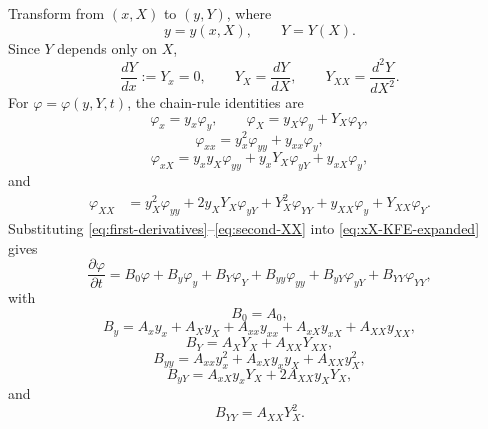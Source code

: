 \documentclass[11pt]{article}
\numberwithin{equation}{section}
\begin{document}
Transform from \((x,X)\) to \((y,Y)\), where
\begin{equation}
\label{eq:coordinate-transform}
y=y(x,X),
\qquad
Y=Y(X).
\end{equation}
Since \(Y\) depends only on \(X\),
\[
\frac{dY}{dx}:=Y_x=0,
\qquad
Y_X=\frac{dY}{dX},
\qquad
Y_{XX}=\frac{d^2Y}{dX^2}.
\]
For \(\varphi=\varphi(y,Y,t)\), the chain-rule identities are
\begin{equation}
\label{eq:first-derivatives}
\varphi_x=y_x\varphi_y,
\qquad
\varphi_X=y_X\varphi_y+Y_X\varphi_Y,
\end{equation}
\begin{equation}
\label{eq:second-xx}
\varphi_{xx}=y_x^2\varphi_{yy}+y_{xx}\varphi_y,
\end{equation}
\begin{equation}
\label{eq:second-xX}
\varphi_{xX}
=
y_xy_X\varphi_{yy}
+
y_xY_X\varphi_{yY}
+
y_{xX}\varphi_y,
\end{equation}
and
\begin{align}
\label{eq:second-XX}
\varphi_{XX}
&=
y_X^2\varphi_{yy}
+
2y_XY_X\varphi_{yY}
+
Y_X^2\varphi_{YY}
+
y_{XX}\varphi_y
+
Y_{XX}\varphi_Y.
\end{align}
Substituting \eqref{eq:first-derivatives}--\eqref{eq:second-XX} into \eqref{eq:xX-KFE-expanded} gives
\begin{equation}
\label{eq:yY-KFE-B}
\frac{\partial\varphi}{\partial t}
=
B_0\varphi+B_y\varphi_y+B_Y\varphi_Y+B_{yy}\varphi_{yy}+B_{yY}\varphi_{yY}+B_{YY}\varphi_{YY},
\end{equation}
with
\begin{equation}
\label{eq:B0}
B_0=A_0,
\end{equation}
\begin{equation}
\label{eq:By}
B_y
=
A_xy_x+A_Xy_X+A_{xx}y_{xx}+A_{xX}y_{xX}+A_{XX}y_{XX},
\end{equation}
\begin{equation}
\label{eq:BY}
B_Y=A_XY_X+A_{XX}Y_{XX},
\end{equation}
\begin{equation}
\label{eq:Byy}
B_{yy}
=
A_{xx}y_x^2+A_{xX}y_xy_X+A_{XX}y_X^2,
\end{equation}
\begin{equation}
\label{eq:ByY}
B_{yY}=A_{xX}y_xY_X+2A_{XX}y_XY_X,
\end{equation}
and
\begin{equation}
\label{eq:BYY}
B_{YY}=A_{XX}Y_X^2.
\end{equation}
\end{document}
